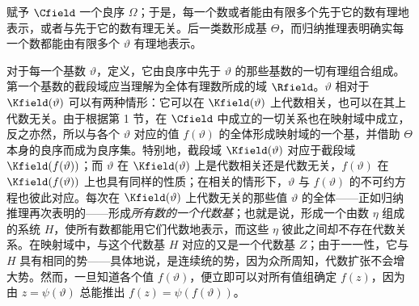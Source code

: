 赋予 \(\Cfield\) 一个良序 \(\Omega\)；于是，每一个数或者能由有限多个先于它的数有理地表示，或者与先于它的数有理无关。后一类数形成基 \(\Theta\)，而归纳推理表明确实每一个数都能由有限多个 \(\vartheta\) 有理地表示。

对于每一个基数 \(\vartheta\)，定义，它由良序中先于 \(\vartheta\) 的那些基数的一切有理组合组成。第一个基数的截段域应当理解为全体有理数所成的域 \(\Rfield\)。\(\vartheta\) 相对于 \(\Kfield(\vartheta)\) 可以有两种情形：它可以在 \(\Kfield(\vartheta)\) 上代数相关，也可以在其上代数无关。由于根据第 1 节，在 \(\Cfield\) 中成立的一切关系也在映射域中成立，反之亦然，所以与各个 \(\vartheta\) 对应的值 \(f(\vartheta)\) 的全体形成映射域的一个基，并借助 \(\Theta\) 本身的良序而成为良序集。特别地，截段域 \(\Kfield(\vartheta)\) 对应于截段域 \(\Kfield(f(\vartheta))\)；而 \(\vartheta\) 在 \(\Kfield(\vartheta)\) 上是代数相关还是代数无关，\(f(\vartheta)\) 在 \(\Kfield(f(\vartheta))\) 上也具有同样的性质；在相关的情形下，\(\vartheta\) 与 \(f(\vartheta)\) 的不可约方程也彼此对应。每次在 \(\Kfield(\vartheta)\) 上代数无关的那些值 \(\vartheta\) 的全体——正如归纳推理再次表明的——形成\emph{所有数的一个代数基}；也就是说，形成一个由数 \(\eta\) 组成的系统 \(H\)，使所有数都能用它们代数地表示，而这些 \(\eta\) 彼此之间却不存在代数关系。在映射域中，与这个代数基 \(H\) 对应的又是一个代数基 \(Z\)；由于一一性，它与 \(H\) 具有相同的势——具体地说，是连续统的势，因为众所周知，代数扩张不会增大势。然而，一旦知道各个值 \(f(\vartheta)\)，便立即可以对所有值组确定 \(f(z)\)，因为由 \(z=\psi(\vartheta)\) 总能推出 \(f(z)=\psi(f(\vartheta))\)。

\medskip
